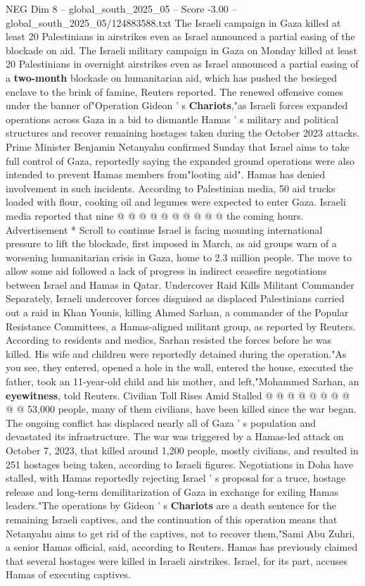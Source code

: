 \begin{textsample}{NEG Dim 8 – global\_south\_2025\_05 – Score -3.00 – global\_south\_2025\_05/124883588.txt}  \label{ex:f8_neg_001}
The Israeli campaign in Gaza killed at least 20 Palestinians in airstrikes even as Israel announced a partial easing of the blockade on aid.
The Israeli military campaign in Gaza on Monday killed at least 20 Palestinians in overnight airstrikes even as Israel announced a partial easing of a \textbf{two-month} blockade on humanitarian aid, which has pushed the besieged enclave to the brink of famine, Reuters reported.
The renewed offensive comes under the banner of"Operation Gideon ' s \textbf{Chariots},"as Israeli forces expanded operations across Gaza in a bid to dismantle Hamas ' s military and political structures and recover remaining hostages taken during the October 2023 attacks.
Prime Minister Benjamin Netanyahu confirmed Sunday that Israel aims to take full control of Gaza, reportedly saying the expanded ground operations were also intended to prevent Hamas members from"looting aid".
Hamas has denied involvement in such incidents.
According to Palestinian media, 50 aid trucks loaded with flour, cooking oil and legumes were expected to enter Gaza.
Israeli media reported that nine @ @ @ @ @ @ @ @ @ @ the coming hours.
Advertisement * Scroll to continue Israel is facing mounting international pressure to lift the blockade, first imposed in March, as aid groups warn of a worsening humanitarian crisis in Gaza, home to 2.3 million people.
The move to allow some aid followed a lack of progress in indirect ceasefire negotiations between Israel and Hamas in Qatar.
Undercover Raid Kills Militant Commander Separately, Israeli undercover forces disguised as displaced Palestinians carried out a raid in Khan Younis, killing Ahmed Sarhan, a commander of the Popular Resistance Committees, a Hamas-aligned militant group, as reported by Reuters.
According to residents and medics, Sarhan resisted the forces before he was killed.
His wife and children were reportedly detained during the operation."As you see, they entered, opened a hole in the wall, entered the house, executed the father, took an 11-year-old child and his mother, and left,"Mohammed Sarhan, an \textbf{eyewitness}, told Reuters.
Civilian Toll Rises Amid Stalled @ @ @ @ @ @ @ @ @ @ 53,000 people, many of them civilians, have been killed since the war began.
The ongoing conflict has displaced nearly all of Gaza ' s population and devastated its infrastructure.
The war was triggered by a Hamas-led attack on October 7, 2023, that killed around 1,200 people, mostly civilians, and resulted in 251 hostages being taken, according to Israeli figures.
Negotiations in Doha have stalled, with Hamas reportedly rejecting Israel ' s proposal for a truce, hostage release and long-term demilitarization of Gaza in exchange for exiling Hamas leaders."The operations by Gideon ' s \textbf{Chariots} are a death sentence for the remaining Israeli captives, and the continuation of this operation means that Netanyahu aims to get rid of the captives, not to recover them,"Sami Abu Zuhri, a senior Hamas official, said, according to Reuters.
Hamas has previously claimed that several hostages were killed in Israeli airstrikes.
Israel, for its part, accuses Hamas of executing captives.

\end{textsample}
